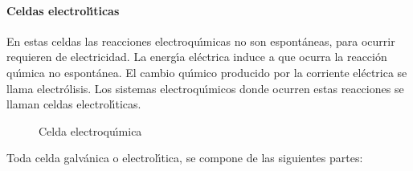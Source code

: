 \paragraph{Celdas electrol\'{\i}ticas}  En estas celdas las reacciones elec\-tro\-qu\'{\i}\-mi\-cas no son
espont\'aneas, para ocurrir requieren de electricidad. La energ\'{\i}a e\-l\'ec\-tri\-ca induce a que ocurra la reacci\'on
qu\'{\i}mica no espont\'anea. El cambio qu\'{\i}\-mi\-co producido por la corriente el\'ectrica se llama electr\'olisis. Los sistemas
electroqu\'{\i}micos donde ocurren estas reacciones se llaman celdas electro\-l\'{\i}\-ti\-cas.
\begin{figure}

\hspace{0.15in} 
\caption{Celda electroqu\'{\i}mica}
\label{fig2:1}
\end{figure}
Toda celda galv\'anica o electrol\'{\i}tica, se compone de las siguientes par\-tes:


